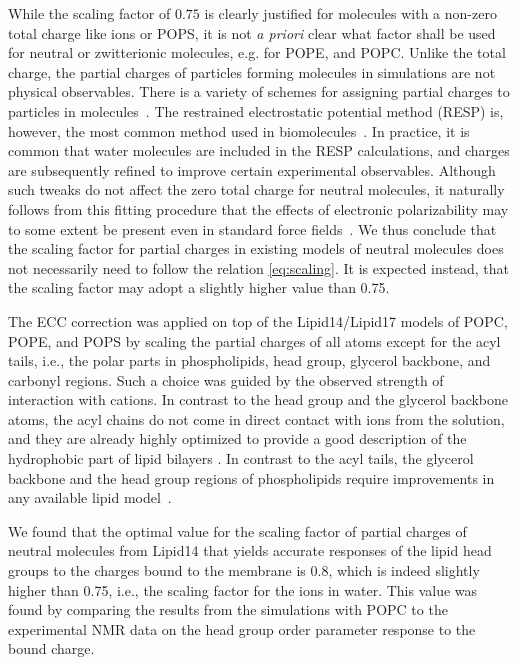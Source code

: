 While the scaling factor of $0.75$ is clearly justified for molecules with a non-zero total charge like ions or POPS,
it is not \emph{a priori} clear what factor shall be used for neutral or zwitterionic molecules, e.g. for POPE, and POPC. 
Unlike the total charge, the partial charges of particles forming molecules in simulations are not physical observables. 
There is a variety of schemes for assigning partial charges to particles in molecules~\citep{Hu2007}. 
The restrained electrostatic potential method (RESP) is, however, the most common method used in biomolecules~\citep{RESP_paper, Singh1984, dickson14}. 
In practice, it is common that water molecules are included in the RESP calculations, 
and charges are subsequently refined to improve certain experimental observables. 
Although such tweaks do not affect the zero total charge for neutral molecules,
it naturally follows from this fitting procedure that the effects of electronic polarizability 
may to some extent be present even in standard force fields~\citep{RESP_paper, Singh1984, jorgensen96, ipolq2013, benavides17}. 
We thus conclude that the scaling factor for partial charges in existing models of neutral molecules does not necessarily need to follow the relation \ref{eq:scaling}.
It is expected instead, that the scaling factor may adopt a slightly higher value than 0.75. 

The ECC correction was applied on top of the Lipid14/Lipid17 models of POPC, POPE, and POPS
by scaling the partial charges of all atoms except for the acyl tails, 
i.e., the polar parts in phospholipids, head group, glycerol backbone, and carbonyl regions. 
Such a choice was guided by the observed strength of interaction with cations. 
In contrast to the head group and the glycerol backbone atoms, 
the acyl chains do not come in direct contact with ions from the solution, 
and they are already highly optimized to provide a good description of the
hydrophobic part of lipid bilayers \cite{dickson14, ollila16, Pluhackova2016}.
In contrast to the acyl tails, the glycerol backbone and the head group regions of phospholipids 
require improvements in any available lipid model~\cite{botan15,nmrlipids_proj4}.

We found that the optimal value for the scaling factor of partial charges of neutral molecules from Lipid14 
that yields accurate responses of the lipid head groups to the charges bound to the membrane
is $0.8$, which is indeed slightly higher than 0.75, 
i.e., the scaling factor for the ions in water. 
This value was found by comparing the results from the simulations with POPC to the experimental 
NMR data on the head group order parameter response to the bound charge. \citep{akutsu81,altenbach84,scherer89}

